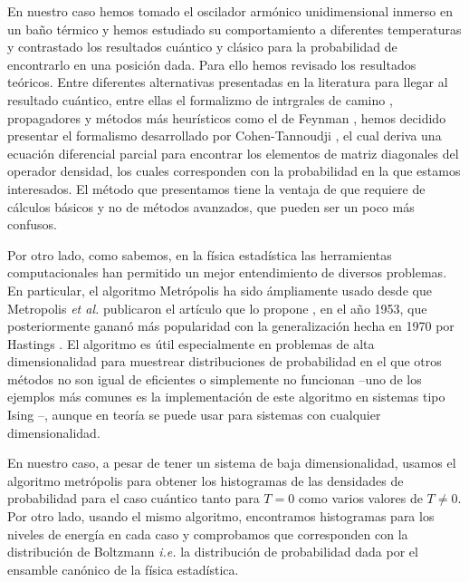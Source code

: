\documentclass[%
 reprint,
 amsmath,amssymb,
 aps,
 pra,
]{revtex4-2}
\begin{document}
En nuestro caso hemos tomado el oscilador armónico unidimensional inmerso en un baño térmico y hemos estudiado su comportamiento a diferentes temperaturas y contrastado los resultados cuántico y clásico para la probabilidad de encontrarlo en una posición dada. Para ello hemos revisado los resultados teóricos. Entre diferentes alternativas presentadas en la literatura para llegar al resultado cuántico, entre ellas el formalizmo de intrgrales de camino \cite{Barone2003,Holstein1998}, propagadores \cite{Kheirandish2018}  y métodos más heurísticos como el de Feynman \cite{RichardP.Feynmann1972}, hemos decidido presentar el formalismo desarrollado por Cohen-Tannoudji \cite{Cohen-Tannoudji}, el cual deriva una ecuación diferencial parcial para encontrar los elementos de matriz diagonales del operador densidad, los cuales corresponden con la probabilidad en la que estamos interesados. El método que presentamos tiene la ventaja de que requiere de cálculos básicos y no de métodos avanzados, que pueden ser un poco más confusos.

Por otro lado, como sabemos, en la física estadística las herramientas computacionales han permitido un mejor entendimiento de diversos problemas. En particular, el algoritmo Metrópolis ha sido ámpliamente usado desde que  Metropolis \textit{et al.} publicaron el artículo que lo propone \cite{Metropolis1953}, en el año 1953, que posteriormente gananó más popularidad con la generalización hecha en 1970 por Hastings \cite{Hastings1970}. El algoritmo es útil especialmente en problemas de alta dimensionalidad para muestrear distribuciones de probabilidad en el que otros métodos no son igual de eficientes o simplemente no funcionan –uno de los ejemplos más comunes es la implementación de este algoritmo en sistemas tipo Ising \cite{Newman1999}–, aunque en teoría se puede usar para sistemas con cualquier dimensionalidad. 

En nuestro caso, a pesar de tener un sistema de baja dimensionalidad, usamos el algoritmo metrópolis para obtener los histogramas de las densidades de probabilidad para el caso cuántico tanto para $T=0$ como varios valores de $T \neq 0$.  Por otro lado, usando el mismo algoritmo, encontramos histogramas para los niveles de energía en cada caso y comprobamos que corresponden con la distribución de Boltzmann \textit{i.e.} la distribución de probabilidad dada por el ensamble canónico de la física estadística.
\end{document}
